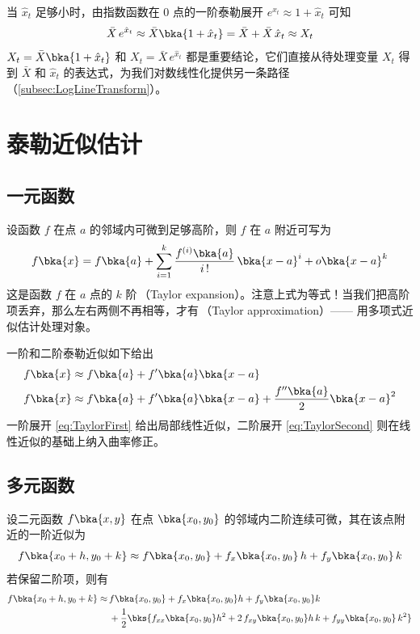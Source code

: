 当 \(\hat x_t\) 足够小时，由指数函数在 0 点的一阶泰勒展开 \(e^{\hat x_t}\approx 1+\hat x_t\) 可知
\begin{equation}
    \bar X\,e^{\hat x_t}\approx\bar X\bka{1+\hat x_t}=\bar X+\bar X\,\hat x_t\approx X_t
    \label{eq:LevelFromHat}
\end{equation}
\(X_t=\bar X\bka{1+\hat x_t}\) 和 \(X_t=\bar X\,e^{\hat x_t}\) 都是重要结论，它们直接从待处理变量 \(X_t\) 得到 \(\bar X\) 和 \(\hat x_t\) 的表达式，为我们对数线性化提供另一条路径（\ref{subsec:LogLineTransform}）。

\section{泰勒近似估计}\label{sec:TaylorApprox}

\subsection{一元函数}\label{subsec:TaylorOneVar}

设函数 \(f\) 在点 \(a\) 的邻域内可微到足够高阶，则 \(f\) 在 \(a\) 附近可写为
\begin{equation}
    f\bka{x}=f\bka{a}+\sum_{i=1}^{k}\frac{f^{(i)}\bka{a}}{i\,!}\,\bka{x-a}^{i}+o\bka{x-a}^{k}
\end{equation}
这是函数 \(f\) 在 \(a\) 点的 \(k\) 阶\,（Taylor expansion）。注意上式为等式！当我们把高阶项丢弃，那么左右两侧不再相等，才有\,（Taylor approximation）—— 用多项式近似估计处理对象。

一阶和二阶泰勒近似如下给出
\begin{align}
    f\bka{x} &\approx f\bka{a}+f'\bka{a}\bka{x-a}\label{eq:TaylorFirst}\\
    f\bka{x} &\approx f\bka{a}+f'\bka{a}\bka{x-a}+\frac{f''\bka{a}}{2}\bka{x-a}^{2}\label{eq:TaylorSecond}
\end{align}
一阶展开 \ref{eq:TaylorFirst} 给出局部线性近似，二阶展开 \ref{eq:TaylorSecond} 则在线性近似的基础上纳入曲率修正。

\subsection{多元函数}\label{subsec:TaylorMultiVar}

设二元函数 \(f\bka{x,y}\) 在点 \(\bka{x_0,y_0}\) 的邻域内二阶连续可微，其在该点附近的一阶近似为
\begin{equation}
    f\bka{x_0+h,y_0+k}\approx f\bka{x_0,y_0}+f_x\bka{x_0,y_0}\,h+f_y\bka{x_0,y_0}\,k\label{eq:MultiTaylor}
\end{equation}
若保留二阶项，则有
\begin{align}
    f\bka{x_0+h,y_0+k}\approx\,& f\bka{x_0,y_0}+f_x\bka{x_0,y_0}h+f_y\bka{x_0,y_0}k\notag\\
    &+\frac12\bks{f_{xx}\bka{x_0,y_0}h^2+2\,f_{xy}\bka{x_0,y_0}h\,k+f_{yy}\bka{x_0,y_0}\,k^2}
\end{align}

